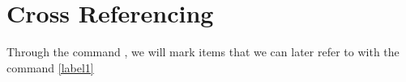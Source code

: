 \section{Cross Referencing}

Through the command \label{label1}, we will mark items that we can later refer to with the command \ref{label1}